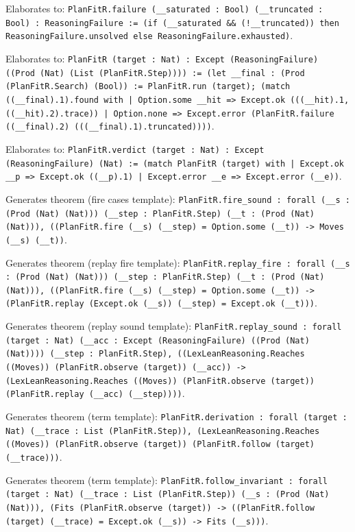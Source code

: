 \documentclass[11pt]{article}
\begin{document}
\noindent Elaborates to: \texttt{PlanFitR.failure (\_\_saturated : Bool) (\_\_truncated : Bool) : ReasoningFailure := (if (\_\_saturated \&\& (!\_\_truncated)) then ReasoningFailure.unsolved else ReasoningFailure.exhausted)}.\par
\noindent Elaborates to: \texttt{PlanFitR (target : Nat) : Except (ReasoningFailure) ((Prod (Nat) (List (PlanFitR.Step)))) := (let \_\_final : (Prod (PlanFitR.Search) (Bool)) := PlanFitR.run (target); (match ((\_\_final).1).found with | Option.some \_\_hit => Except.ok (((\_\_hit).1, ((\_\_hit).2).trace)) | Option.none => Except.error (PlanFitR.failure ((\_\_final).2) (((\_\_final).1).truncated))))}.\par
\noindent Elaborates to: \texttt{PlanFitR.verdict (target : Nat) : Except (ReasoningFailure) (Nat) := (match PlanFitR (target) with | Except.ok \_\_p => Except.ok ((\_\_p).1) | Except.error \_\_e => Except.error (\_\_e))}.\par
\noindent Generates theorem (fire cases template): \texttt{PlanFitR.fire\_sound : forall (\_\_s : (Prod (Nat) (Nat))) (\_\_step : PlanFitR.Step) (\_\_t : (Prod (Nat) (Nat))), ((PlanFitR.fire (\_\_s) (\_\_step) = Option.some (\_\_t)) -> Moves (\_\_s) (\_\_t))}.\par
\noindent Generates theorem (replay fire template): \texttt{PlanFitR.replay\_fire : forall (\_\_s : (Prod (Nat) (Nat))) (\_\_step : PlanFitR.Step) (\_\_t : (Prod (Nat) (Nat))), ((PlanFitR.fire (\_\_s) (\_\_step) = Option.some (\_\_t)) -> (PlanFitR.replay (Except.ok (\_\_s)) (\_\_step) = Except.ok (\_\_t)))}.\par
\noindent Generates theorem (replay sound template): \texttt{PlanFitR.replay\_sound : forall (target : Nat) (\_\_acc : Except (ReasoningFailure) ((Prod (Nat) (Nat)))) (\_\_step : PlanFitR.Step), ((LexLeanReasoning.Reaches ((Moves)) (PlanFitR.observe (target)) (\_\_acc)) -> (LexLeanReasoning.Reaches ((Moves)) (PlanFitR.observe (target)) (PlanFitR.replay (\_\_acc) (\_\_step))))}.\par
\noindent Generates theorem (term template): \texttt{PlanFitR.derivation : forall (target : Nat) (\_\_trace : List (PlanFitR.Step)), (LexLeanReasoning.Reaches ((Moves)) (PlanFitR.observe (target)) (PlanFitR.follow (target) (\_\_trace)))}.\par
\noindent Generates theorem (term template): \texttt{PlanFitR.follow\_invariant : forall (target : Nat) (\_\_trace : List (PlanFitR.Step)) (\_\_s : (Prod (Nat) (Nat))), (Fits (PlanFitR.observe (target)) -> ((PlanFitR.follow (target) (\_\_trace) = Except.ok (\_\_s)) -> Fits (\_\_s)))}.\par
\end{document}
